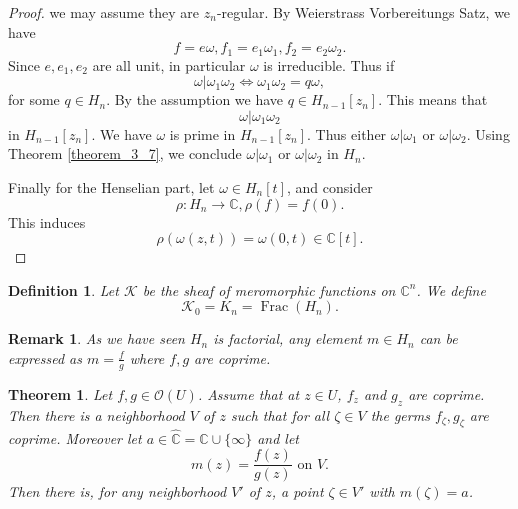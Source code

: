 \documentclass{article}
\newtheorem{theorem}{Theorem} [section]
\newtheorem{definition}{Definition}[section]
\newtheorem{remark}{Remark}[section]
\DeclareMathOperator{\Frac}{Frac}
\newcommand{\C}[0]{\mathbb{C}}
\begin{document}
\begin{proof}
  we may assume they are $z_n$-regular. By Weierstrass Vorbereitungs Satz, we have 
  \begin{equation*}
    f=e\omega,f_1=e_1\omega_1,f_2=e_2\omega_2.
  \end{equation*}
  Since $e,e_1,e_2$ are all unit, in particular $\omega$ is irreducible. Thus if 
  \begin{equation*}
    \omega|\omega_1\omega_2\Leftrightarrow \omega_1\omega_2 = q\omega,
  \end{equation*}
  for some $q\in H_n$. By the assumption we have $q\in H_{n-1}[z_n]$. This means that 
  \begin{equation*}
    \omega|\omega_1\omega_2
  \end{equation*}
  in $H_{n-1}[z_n]$. We have $\omega$ is prime in $H_{n-1}[z_n]$. Thus either $\omega|\omega_1$ or $\omega|\omega_2$. Using Theorem \ref{theorem_3_7}, we conclude $\omega|\omega_1$ or $\omega|\omega_2$ in $H_n$.
  \par Finally for the Henselian part, let $\omega\in H_n[t]$, and consider
  \begin{equation*}
    \rho:H_n\to\C, \rho(f) = f(0).
  \end{equation*}
  This induces 
  \begin{equation*}
    \rho(\omega(z,t)) = \omega(0,t)\in\C[t].
  \end{equation*}
\end{proof}

\begin{definition}
  Let $\mathcal{K}$ be the sheaf of meromorphic functions on $\C^n$. 
  We define 
  \begin{equation*}
    \mathcal{K}_0 = K_n = \Frac(H_n).
  \end{equation*}
\end{definition}

\begin{remark}
  As we have seen $H_n$ is factorial, any element $m\in H_n$ can be expressed as $m={\frac f g}$ where $f,g$ are coprime.
\end{remark}

\begin{theorem}
  \label{theorem_4_3_dash}
  Let $f,g\in\mathcal{O}(U)$. Assume that at $z\in U$, $f_z$ and $g_z$ are coprime. Then there is a neighborhood $V$ of $z$ such that 
  for all $\zeta\in V$ the germs $f_\zeta,g_\zeta$ are coprime. Moreover let $a\in \hat{\C}=\C\cup\{\infty\}$ and let 
  \begin{equation*}
    m(z) = {\frac {f(z)} {g(z)}}\text{ on } V.
  \end{equation*}
  Then there is, 
  for any neighborhood $V'$ of $z$, a point $\zeta\in V'$ with $m(\zeta) =a$. 
\end{theorem}
\end{document}
